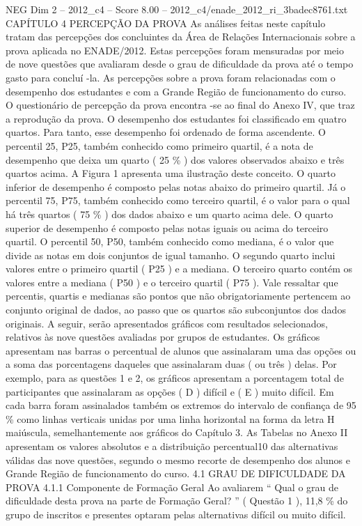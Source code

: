 \begin{textsample}{NEG Dim 2 – 2012\_c4 – Score 8.00 – 2012\_c4/enade\_2012\_ri\_3badec8761.txt}  \label{ex:f2_neg_325}
CAPÍTULO 4 PERCEPÇÃO DA PROVA As análises feitas neste capítulo tratam das percepções dos concluintes da Área de Relações Internacionais sobre a prova aplicada no ENADE/2012.
Estas percepções foram mensuradas por meio de nove questões que avaliaram desde o grau de dificuldade da prova até o tempo gasto para concluí -la.
As percepções sobre a prova foram relacionadas com o desempenho dos estudantes e com a Grande Região de funcionamento do curso.
O questionário de percepção da prova encontra -se ao final do Anexo IV, que traz a reprodução da prova.
O desempenho dos estudantes foi classificado em quatro quartos.
Para tanto, esse desempenho foi ordenado de forma ascendente.
O percentil 25, P25, também conhecido como primeiro quartil, é a nota de desempenho que deixa um quarto ( 25 \% ) dos valores observados abaixo e três quartos acima.
A Figura 1 apresenta uma ilustração deste conceito.
O quarto inferior de desempenho é composto pelas notas abaixo do primeiro quartil.
Já o percentil 75, P75, também conhecido como terceiro quartil, é o valor para o qual há três quartos ( 75 \% ) dos dados abaixo e um quarto acima dele.
O quarto superior de desempenho é composto pelas notas iguais ou acima do terceiro quartil.
O percentil 50, P50, também conhecido como mediana, é o valor que divide as notas em dois conjuntos de igual tamanho.
O segundo quarto inclui valores entre o primeiro quartil ( P25 ) e a mediana.
O terceiro quarto contém os valores entre a mediana ( P50 ) e o terceiro quartil ( P75 ).
Vale ressaltar que percentis, quartis e medianas são pontos que não obrigatoriamente pertencem ao conjunto original de dados, ao passo que os quartos são subconjuntos dos dados originais.
A seguir, serão apresentados gráficos com resultados selecionados, relativos às nove questões avaliadas por grupos de estudantes.
Os gráficos apresentam nas barras o percentual de alunos que assinalaram uma das opções ou a soma das porcentagens daqueles que assinalaram duas ( ou três ) delas.
Por exemplo, para as questões 1 e 2, os gráficos apresentam a porcentagem total de participantes que assinalaram as opções ( D ) difícil e ( E ) muito difícil.
Em cada barra foram assinalados também os extremos do intervalo de confiança de 95 \% como linhas verticais unidas por uma linha horizontal na forma da letra H maiúscula, semelhantemente aos gráficos do Capítulo 3.
As Tabelas no Anexo II apresentam os valores absolutos e a distribuição percentual10 das alternativas válidas das nove questões, segundo o mesmo recorte de desempenho dos alunos e Grande Região de funcionamento do curso. 4.1 GRAU DE DIFICULDADE DA PROVA 4.1.1 Componente de Formação Geral Ao avaliarem “ Qual o grau de dificuldade desta prova na parte de Formação Geral? ” ( Questão 1 ), 11,8 \% do grupo de inscritos e presentes optaram pelas alternativas difícil ou muito difícil.

\end{textsample}
